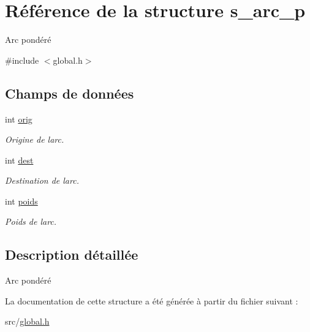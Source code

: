 \hypertarget{structs__arc__p}{}\section{Référence de la structure s\+\_\+arc\+\_\+p}
\label{structs__arc__p}


Arc pondéré  




{\ttfamily \#include $<$global.\+h$>$}

\subsection*{Champs de données}
\begin{DoxyCompactItemize}
\item 
\mbox{\label{structs__arc__p_a9e217f04c0fbbe53b5ad22ba4eb2af25}} 
int \mbox{\hyperlink{structs__arc__p_a9e217f04c0fbbe53b5ad22ba4eb2af25}{orig}}
\begin{DoxyCompactList}\small\item\em Origine de l\textquotesingle{}arc. \end{DoxyCompactList}\item 
\mbox{\label{structs__arc__p_ae5163ff230abd4115d86194ad89467b5}} 
int \mbox{\hyperlink{structs__arc__p_ae5163ff230abd4115d86194ad89467b5}{dest}}
\begin{DoxyCompactList}\small\item\em Destination de l\textquotesingle{}arc. \end{DoxyCompactList}\item 
\mbox{\label{structs__arc__p_ac1abe8fa63a4167cf11ef707f524f0c4}} 
int \mbox{\hyperlink{structs__arc__p_ac1abe8fa63a4167cf11ef707f524f0c4}{poids}}
\begin{DoxyCompactList}\small\item\em Poids de l\textquotesingle{}arc. \end{DoxyCompactList}\end{DoxyCompactItemize}


\subsection{Description détaillée}
Arc pondéré 

La documentation de cette structure a été générée à partir du fichier suivant \+:\begin{DoxyCompactItemize}
\item 
src/\mbox{\hyperlink{global_8h}{global.\+h}}\end{DoxyCompactItemize}
